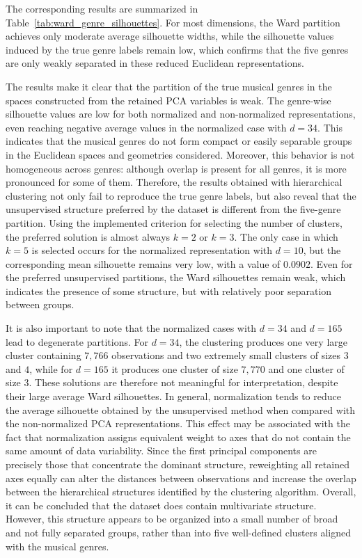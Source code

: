 The corresponding results are summarized in Table~\ref{tab:ward_genre_silhouettes}. For most dimensions, the Ward partition achieves only moderate average silhouette widths, while the silhouette values induced by the true genre labels remain low, which confirms that the five genres are only weakly separated in these reduced Euclidean representations.

The results make it clear that the partition of the true musical genres in the spaces constructed from the retained PCA variables is weak. The genre-wise silhouette values are low for both normalized and non-normalized representations, even reaching negative average values in the normalized case with \(d=34\). This indicates that the musical genres do not form compact or easily separable groups in the Euclidean spaces and geometries considered. Moreover, this behavior is not homogeneous across genres: although overlap is present for all genres, it is more pronounced for some of them. Therefore, the results obtained with hierarchical clustering not only fail to reproduce the true genre labels, but also reveal that the unsupervised structure preferred by the dataset is different from the five-genre partition. Using the implemented criterion for selecting the number of clusters, the preferred solution is almost always \(k=2\) or \(k=3\). The only case in which \(k=5\) is selected occurs for the normalized representation with \(d=10\), but the corresponding mean silhouette remains very low, with a value of \(0.0902\). Even for the preferred unsupervised partitions, the Ward silhouettes remain weak, which indicates the presence of some structure, but with relatively poor separation between groups.

It is also important to note that the normalized cases with \(d=34\) and \(d=165\) lead to degenerate partitions. For \(d=34\), the clustering produces one very large cluster containing \(7{,}766\) observations and two extremely small clusters of sizes \(3\) and \(4\), while for \(d=165\) it produces one cluster of size \(7{,}770\) and one cluster of size \(3\). These solutions are therefore not meaningful for interpretation, despite their large average Ward silhouettes. In general, normalization tends to reduce the average silhouette obtained by the unsupervised method when compared with the non-normalized PCA representations. This effect may be associated with the fact that normalization assigns equivalent weight to axes that do not contain the same amount of data variability. Since the first principal components are precisely those that concentrate the dominant structure, reweighting all retained axes equally can alter the distances between observations and increase the overlap between the hierarchical structures identified by the clustering algorithm. Overall, it can be concluded that the dataset does contain multivariate structure. However, this structure appears to be organized into a small number of broad and not fully separated groups, rather than into five well-defined clusters aligned with the musical genres.

